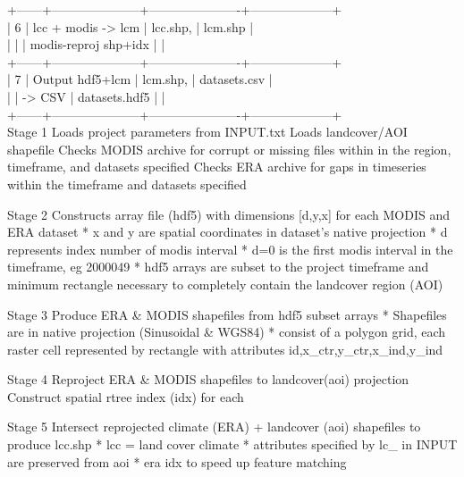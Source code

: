 \documentclass[twoside,a4paper]{refart}
\begin{document}
    +------+---------------------+----------------------+--------------------+\\
    | 6    | lcc + modis -> lcm  | lcc.shp,             | lcm.shp            |\\
    |      |                     | modis-reproj shp+idx |                    |\\
    +------+---------------------+----------------------+--------------------+\\
    | 7    |  Output hdf5+lcm    | lcm.shp,             | datasets.csv       |\\
    |      |  -> CSV             | datasets.hdf5        |                    |\\
    +------+---------------------+----------------------+--------------------+\\



      Stage 1
        Loads project parameters from INPUT.txt
        Loads landcover/AOI shapefile
        Checks MODIS archive for corrupt or missing files
          within in the region, timeframe, and datasets specified
        Checks ERA archive for gaps in timeseries
          within the timeframe and datasets specified

      Stage 2
        Constructs array file (hdf5) with dimensions [d,y,x] for each
        MODIS and ERA dataset
        * x and y are spatial coordinates in dataset's native projection
        * d represents index number of modis interval
        * d=0 is the first modis interval in the timeframe, eg 2000049
        * hdf5 arrays are subset to the project timeframe and minimum
          rectangle necessary to completely contain the landcover region (AOI)

      Stage 3
        Produce ERA \& MODIS shapefiles from hdf5 subset arrays
        * Shapefiles are in native projection (Sinusoidal \& WGS84)
        * consist of a polygon grid, each raster cell represented by
          rectangle with attributes id,x\_ctr,y\_ctr,x\_ind,y\_ind

      Stage 4
        Reproject ERA \& MODIS shapefiles to landcover(aoi) projection
        Construct spatial rtree index (idx) for each

      Stage 5
        Intersect reprojected climate (ERA) + landcover (aoi) shapefiles
        to produce lcc.shp
          * lcc = land cover climate
          * attributes specified by lc\_ in INPUT are preserved from aoi
          * era idx to speed up feature matching
\end{document}

